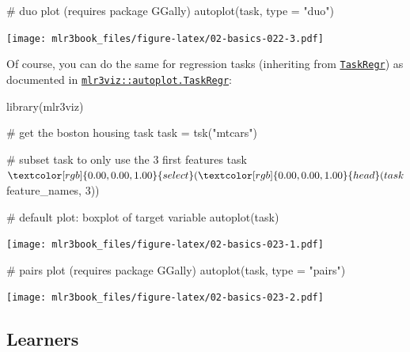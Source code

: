 \documentclass[]{article}
\newenvironment{Shaded}{}{}
\newcommand{\CommentTok}[1]{\textcolor[rgb]{0.00,0.50,0.00}{#1}}
\newcommand{\DataTypeTok}[1]{#1}
\newcommand{\DecValTok}[1]{#1}
\newcommand{\KeywordTok}[1]{\textcolor[rgb]{0.00,0.00,1.00}{#1}}
\newcommand{\NormalTok}[1]{#1}
\newcommand{\OperatorTok}[1]{#1}
\newcommand{\StringTok}[1]{\textcolor[rgb]{0.00,0.50,0.50}{#1}}
\renewenvironment{Shaded} {\begin{snugshade}\small} {\end{snugshade}}
\begin{document}
\begin{Shaded}
\begin{Highlighting}[]

\CommentTok{# duo plot (requires package GGally)}
\KeywordTok{autoplot}\NormalTok{(task, }\DataTypeTok{type =} \StringTok{"duo"}\NormalTok{)}
\end{Highlighting}
\end{Shaded}

\texttt{[image: mlr3book\_files/figure-latex/02-basics-022-3.pdf]}

Of course, you can do the same for regression tasks (inheriting from \href{https://mlr3.mlr-org.com/reference/TaskRegr.html}{\texttt{TaskRegr}}) as documented in \href{https://mlr3viz.mlr-org.com/reference/autoplot.TaskRegr.html}{\texttt{mlr3viz::autoplot.TaskRegr}}:

\begin{Shaded}
\begin{Highlighting}[]
\KeywordTok{library}\NormalTok{(mlr3viz)}

\CommentTok{# get the boston housing task}
\NormalTok{task =}\StringTok{ }\KeywordTok{tsk}\NormalTok{(}\StringTok{"mtcars"}\NormalTok{)}

\CommentTok{# subset task to only use the 3 first features}
\NormalTok{task}\OperatorTok{$}\KeywordTok{select}\NormalTok{(}\KeywordTok{head}\NormalTok{(task}\OperatorTok{$}\NormalTok{feature_names, }\DecValTok{3}\NormalTok{))}

\CommentTok{# default plot: boxplot of target variable}
\KeywordTok{autoplot}\NormalTok{(task)}
\end{Highlighting}
\end{Shaded}

\texttt{[image: mlr3book\_files/figure-latex/02-basics-023-1.pdf]}

\begin{Shaded}
\begin{Highlighting}[]

\CommentTok{# pairs plot (requires package GGally)}
\KeywordTok{autoplot}\NormalTok{(task, }\DataTypeTok{type =} \StringTok{"pairs"}\NormalTok{)}
\end{Highlighting}
\end{Shaded}

\texttt{[image: mlr3book\_files/figure-latex/02-basics-023-2.pdf]}

\hypertarget{learners}{%
\subsection{Learners}\label{learners}}
\end{document}
